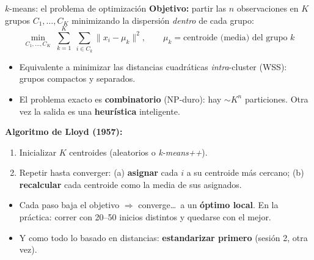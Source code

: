 \documentclass{beamer}
\newcommand{\1}{\mathbb{I}}
\begin{document}
\begin{frame}{$k$-means: el problema de optimización}
\small
\textbf{Objetivo:} partir las $n$ observaciones en $K$ grupos $C_1, \ldots, C_K$ minimizando la dispersión \emph{dentro} de cada grupo:
\[ \min_{C_1, \ldots, C_K} \; \sum_{k=1}^{K} \; \sum_{i \in C_k} \big\| x_i - \mu_k \big\|^2, \qquad \mu_k = \text{centroide (media) del grupo } k \]
\pause

\begin{itemize}\itemsep5pt
  \item Equivalente a minimizar las distancias cuadráticas \emph{intra}-cluster (WSS): grupos compactos y separados.
  \item El problema exacto es \textbf{combinatorio} (NP-duro): hay $\sim K^n$ particiones. Otra vez la salida es una \textbf{heurística} inteligente. \pause
\end{itemize}

\vspace{0.15cm}
\textbf{Algoritmo de Lloyd (1957):}
\begin{enumerate}\itemsep3pt
  \item Inicializar $K$ centroides (aleatorios o \emph{k-means++}).
  \item Repetir hasta converger: (a) \textbf{asignar} cada $i$ a su centroide más cercano; (b) \textbf{recalcular} cada centroide como la media de sus asignados.
\end{enumerate}
\pause

\begin{itemize}\itemsep3pt
  \item Cada paso baja el objetivo $\Rightarrow$ converge\ldots\ a un \textbf{óptimo local}. En la práctica: correr con 20--50 inicios distintos y quedarse con el mejor.
  \item Y como todo lo basado en distancias: \textbf{estandarizar primero} (sesión 2, otra vez).
\end{itemize}
\end{frame}
\end{document}

